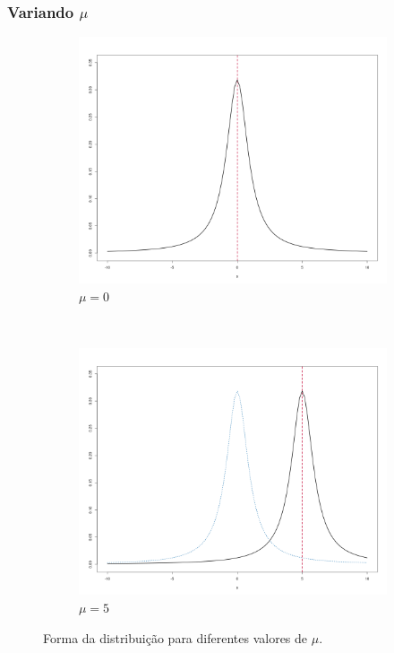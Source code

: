 \documentclass[13pt, aspectratio=169]{beamer}
\begin{document}
\begin{frame}
    \frametitle{Variando $\mu$}

    \begin{figure}[!ht]
        \centering
        \begin{subfigure}[t]{0.4\textwidth}
            \centering
            \includegraphics[width=\textwidth]{images/variando_mu_1.png}
            \caption{$\mu = 0$}
        \end{subfigure}%
        ~
        \begin{subfigure}[t]{0.4\textwidth}
            \centering
            \includegraphics[width=\textwidth]{images/variando_mu_2.png}
            \caption{$\mu = 5$}
        \end{subfigure}%
        \caption{Forma da distribuição para diferentes valores de $\mu$.}
    \end{figure}

    

\end{frame}
\end{document}
